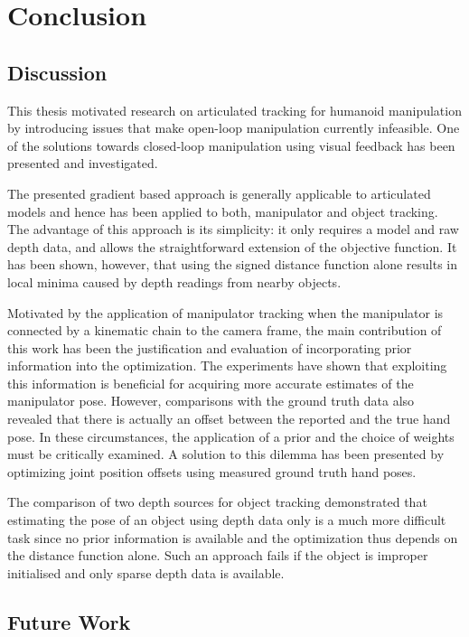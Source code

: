 \chapter{Conclusion}
\label{sec:conclusion}

\section{Discussion}

This thesis motivated research on articulated tracking for humanoid manipulation by introducing issues that make open-loop manipulation currently infeasible. One of the solutions towards closed-loop manipulation using visual feedback has been presented and investigated.

The presented gradient based approach is generally applicable to articulated models and hence has been applied to both, manipulator and object tracking. The advantage of this approach is its simplicity: it only requires a model and raw depth data, and allows the straightforward extension of the objective function.
It has been shown, however, that using the signed distance function alone results in local minima caused by depth readings from nearby objects.

Motivated by the application of manipulator tracking when the manipulator is connected by a kinematic chain to the camera frame, the main contribution of this work has been the justification and evaluation of incorporating prior information into the optimization.
The experiments have shown that exploiting this information is beneficial for acquiring more accurate estimates of the manipulator pose.
However, comparisons with the ground truth data also revealed that there is actually an offset between the reported and the true hand pose. In these circumstances, the application of a prior and the choice of weights must be critically examined. A solution to this dilemma has been presented by optimizing joint position offsets using measured ground truth hand poses.

The comparison of two depth sources for object tracking demonstrated that estimating the pose of an object using depth data only is a much more difficult task since no prior information is available and the optimization thus depends on the distance function alone. Such an approach fails if the object is improper initialised and only sparse depth data is available.


\section{Future Work}

